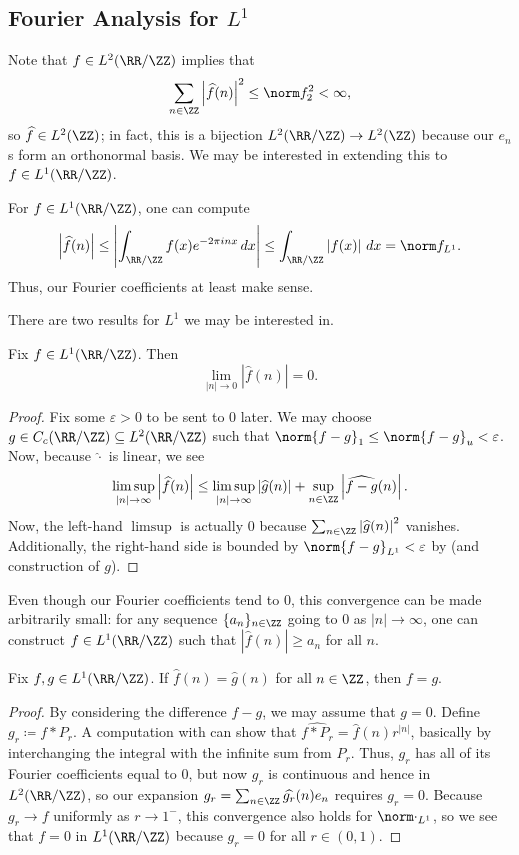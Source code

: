 \documentclass[../notes.tex]{subfiles}
\begin{document}
\subsection{Fourier Analysis for \texorpdfstring{$L^1$}{ L1}}
Note that $f\in L^2(\RR/\ZZ)$ implies that
\[\sum_{n\in\ZZ}\left|\widehat f(n)\right|^2\le\norm f_2^2<\infty,\]
so $\widehat f\in L^2(\ZZ)$; in fact, this is a bijection $L^2(\RR/\ZZ)\to L^2(\ZZ)$ because our $e_n$s form an orthonormal basis. We may be interested in extending this to $f\in L^1(\RR/\ZZ)$.
\begin{remark} \label{rem:l1-fourier-coef}
	For $f\in L^1(\RR/\ZZ)$, one can compute
	\[\left|\widehat f(n)\right|\le\left|\int_{\RR/\ZZ}f(x)e^{-2\pi inx}\,dx\right|\le\int_{\RR/\ZZ}\left|f(x)\right|\,dx=\norm f_{L^1}.\]
	Thus, our Fourier coefficients at least make sense.
\end{remark}
There are two results for $L^1$ we may be interested in.
\begin{proposition} \label{prop:fourier-l1-to-zero}
	Fix $f\in L^1(\RR/\ZZ)$. Then
	\[\lim_{\left|n\right|\to0}\left|\widehat f(n)\right|=0.\]
\end{proposition}
\begin{proof}
	Fix some $\varepsilon>0$ to be sent to $0$ later. We may choose $g\in C_c(\RR/\ZZ)\subseteq L^2(\RR/\ZZ)$ such that $\norm{f-g}_1\le\norm{f-g}_u<\varepsilon$. Now, because $\widehat\cdot$ is linear, we see
	\[\limsup_{\left|n\right|\to\infty}\left|\widehat f(n)\right|\le\limsup_{\left|n\right|\to\infty}\left|\widehat g(n)\right|+\sup_{n\in\ZZ}\left|\widehat{f-g}(n)\right|.\]
	Now, the left-hand $\limsup$ is actually $0$ because $\sum_{n\in\ZZ}\left|\widehat g(n)\right|^2$ vanishes. Additionally, the right-hand side is bounded by $\norm{f-g}_{L^1}<\varepsilon$ by  (and construction of $g$).
\end{proof}
\begin{remark}
	Even though our Fourier coefficients tend to $0$, this convergence can be made arbitrarily small: for any sequence $\{a_n\}_{n\in\ZZ}$ going to $0$ as $\left|n\right|\to\infty$, one can construct $f\in L^1(\RR/\ZZ)$ such that $\left|\widehat f(n)\right|\ge a_n$ for all $n$.
\end{remark}
\begin{proposition} \label{prop:fourier-uniq}
	Fix $f,g\in L^1(\RR/\ZZ)$. If $\widehat f(n)=\widehat g(n)$ for all $n\in\ZZ$, then $f=g$.
\end{proposition}
\begin{proof}
	By considering the difference $f-g$, we may assume that $g=0$. Define $g_r\coloneqq f*P_r$. A computation with  can show that $\widehat{f*P_r}=\widehat f(n)r^{\left|n\right|}$, basically by interchanging the integral with the infinite sum from $P_r$. Thus, $g_r$ has all of its Fourier coefficients equal to $0$, but now $g_r$ is continuous and hence in $L^2(\RR/\ZZ)$, so our expansion $g_r=\sum_{n\in\ZZ}\widehat{g_r}(n)e_n$ requires $g_r=0$. Because $g_r\to f$ uniformly as $r\to1^-$, this convergence also holds for $\norm\cdot_{L^1}$, so we see that $f=0$ in $L^1(\RR/\ZZ)$ because $g_r=0$ for all $r\in(0,1)$.
\end{proof}
\end{document}
